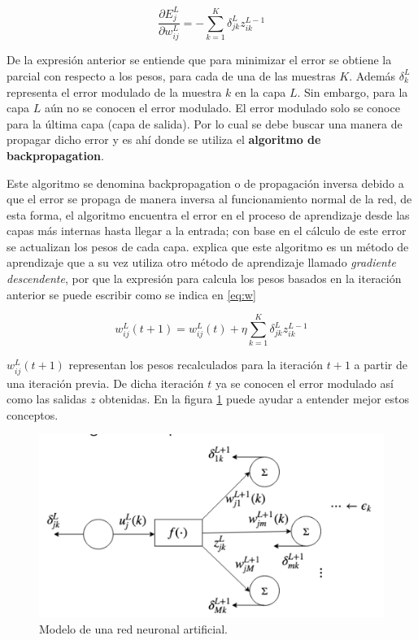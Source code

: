 \documentclass[a4paper,12pt,twocolumn]{article}
\begin{document}
  \begin{equation}
    \dfrac{\partial E_{j}^{L}}{\partial w_{ij}^{L}} =
    -\sum_{k=1}^{K} \delta_{jk}^{L} z_{ik}^{L-1} \label{eq:error-01}
  \end{equation}

  De la expresión anterior se entiende que para minimizar el error se obtiene la
  parcial con respecto a los pesos, para cada de una de las muestras $K$. Además
  $\delta_{k}^{L}$ representa el error modulado de la muestra $k$ en la capa
  $L$.  Sin embargo, para la capa $L$ aún no se conocen el error modulado. El
  error modulado solo se conoce para la última capa (capa de salida). Por lo
  cual se debe buscar una manera de propagar dicho error y es ahí donde se
  utiliza el \textbf{algoritmo de backpropagation}.

  Este algoritmo se denomina backpropagation o de propagación inversa debido a
  que el error se propaga de manera inversa al funcionamiento normal de la red,
  de esta forma, el algoritmo encuentra el error en el proceso de aprendizaje
  desde las capas más internas hasta llegar a la entrada; con base en el cálculo
  de este error se actualizan los pesos de cada capa.
  \cite{inbook01} explica que este algoritmo es un método de aprendizaje que a
  su vez utiliza otro método de aprendizaje llamado \textit{gradiente
  descendente}, por que la expresión para
  calcula los pesos basados en la iteración anterior se puede escribir como se
  indica en \ref{eq:w}

  \begin{equation}
    w_{ij}^{L}(t+1) = w_{ij}^{L}(t) + \eta
    \sum_{k=1}^{K}\delta_{jk}^{L}z_{ik}^{L-1}\label{eq:w}
  \end{equation}

  $w_{ij}^{L}(t+1)$ representan los pesos recalculados para la iteración $t + 1$
  a partir de una iteración previa. De dicha iteración $t$ ya se conocen el
  error modulado así como las salidas $z$ obtenidas. En la figura
  \ref{fig:modelo-neurona} puede ayudar a entender mejor estos conceptos.

  \begin{figure}[ht!]
    \centering
    \includegraphics[width=0.9\linewidth]{backpropagation}
    \caption{Modelo de una red neuronal artificial.}
    \label{fig:modelo-neurona}
  \end{figure}
\end{document}
